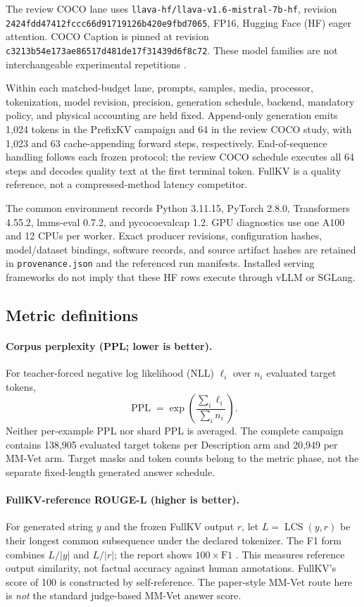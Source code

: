 \documentclass[10pt,letterpaper]{article}
\begin{document}
The review COCO lane uses \nolinkurl{llava-hf/llava-v1.6-mistral-7b-hf}, revision
\nolinkurl{2424fdd47412fccc66d91719126b420e9fbd7065}, FP16, Hugging Face
(HF) eager attention. COCO Caption is pinned at revision
\nolinkurl{c3213b54e173ae86517d481de17f31439d6f8c72}. These model families
are not interchangeable experimental repetitions \citep{liu2024improved}.

Within each matched-budget lane, prompts, samples, media, processor,
tokenization, model revision, precision, generation schedule, backend,
mandatory policy, and physical accounting are held fixed. Append-only
generation emits 1,024 tokens in the PrefixKV campaign and 64 in the
review COCO study, with 1,023 and 63 cache-appending forward steps,
respectively. End-of-sequence handling follows each frozen protocol; the
review COCO schedule executes all 64 steps and decodes quality text at the
first terminal token. FullKV is a quality reference, not a compressed-method
latency competitor.

The common environment records Python 3.11.15, PyTorch 2.8.0, Transformers
4.55.2, lmms-eval 0.7.2, and pycocoevalcap 1.2. GPU diagnostics use one
A100 and 12 CPUs per worker. Exact producer revisions, configuration
hashes, model/dataset bindings, software records, and source artifact hashes
are retained in \texttt{provenance.json} and the referenced run manifests.
Installed serving frameworks do not imply that these HF rows execute through
vLLM or SGLang.

\subsection{Metric definitions}
\paragraph{Corpus perplexity (PPL; lower is better).}
For teacher-forced negative log likelihood (NLL) $\ell_i$ over $n_i$
evaluated target tokens,
\begin{equation}
\operatorname{PPL}=\exp\left(\frac{\sum_i\ell_i}{\sum_i n_i}\right).
\end{equation}
Neither per-example PPL nor shard PPL is averaged. The complete campaign
contains 138,905 evaluated target tokens per Description arm and 20,949
per MM-Vet arm. Target masks and token counts belong to the metric phase,
not the separate fixed-length generated answer schedule.

\paragraph{FullKV-reference ROUGE-L (higher is better).}
For generated string $y$ and the frozen FullKV output $r$, let
$L=\operatorname{LCS}(y,r)$ be their longest common subsequence under the
declared tokenizer. The F1 form combines $L/|y|$ and $L/|r|$; the report
shows $100\times\mathrm{F1}$ \citep{lin2004rouge}. This measures reference
output similarity, not factual accuracy against human annotations.
FullKV's score of 100 is constructed by self-reference. The paper-style
MM-Vet route here is \emph{not} the standard judge-based MM-Vet answer score.
\end{document}
